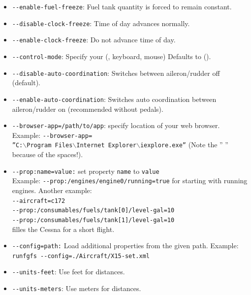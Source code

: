 \begin{itemize}
\item{\texttt{-$ $-enable-fuel-freeze}}: Fuel tank quantity is forced to remain constant.
\item{\texttt{-$ $-disable-clock-freeze}}: Time of day advances normally.
\item{\texttt{-$ $-enable-clock-freeze}}: Do not advance time of day.
\item{\texttt{-$ $-control-mode}}: Specify your  (,
 keyboard, mouse) Defaults to  ().
\item{\texttt{-$ $-disable-auto-coordination}}: Switches  between
aileron/rudder off (default).
\item{\texttt{-$ $-enable-auto-coordination}}: Switches auto coordination between
aileron/rudder on (recommended without pedals).
\item{\texttt{-$ $-browser-app=/path/to/app}}:  specify location of your web browser. Example:
\texttt{-$ $-browser-app=}\\  \texttt{''C:$\backslash$Program~Files$\backslash$Internet~Explorer$\backslash$iexplore.exe''} (Note the '' '' because of the spaces!).
\item{\texttt{-$ $-prop:name=value:}}  set property \texttt{name} to \texttt{value}\\Example:
\texttt{-$ $-prop:/engines/engine0/running=true} for starting with running engines. Another example:\\
\texttt{-$ $-aircraft=c172}\\
\texttt{-$ $-prop:/consumables/fuels/tank[0]/level-gal=10}\\
\texttt{-$ $-prop:/consumables/fuels/tank[1]/level-gal=10}\\
filles the Cessna for a short flight.
\item{\texttt{-$ $-config=path:}}  Load additional properties from the given path. Example: \texttt{runfgfs -$ $-config=./Aircraft/X15-set.xml}
\item{\texttt{-$ $-units-feet}}: Use feet for distances.
\item{\texttt{-$ $-units-meters}}: Use meters for distances.
\end{itemize}
